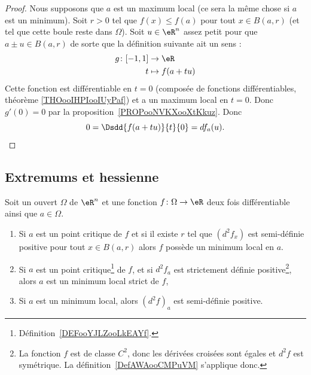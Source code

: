 \begin{proof}
	Nous supposons que \( a\) est un maximum local (ce sera la même chose si \( a\) est un minimum). Soit \( r>0\) tel que \( f(x)\leq f(a)\) pour tout \( x\in B(a,r)\) (et tel que cette boule reste dans \( \Omega\)). Soit \( u\in \eR^n\) assez petit pour que \( a\pm u\in B(a,r)\) de sorte que la définition suivante ait un sens :
	\begin{equation}
		\begin{aligned}
			g\colon \mathopen[ -1 , 1 \mathclose] & \to \eR         \\
			t                                     & \mapsto f(a+tu)
		\end{aligned}
	\end{equation}
	Cette fonction est différentiable en \( t=0\) (composée de fonctions différentiables, théorème \ref{THOooIHPIooIUyPaf}) et a un maximum local en \( t=0\). Donc \( g'(0)=0\) par la proposition~\ref{PROPooNVKXooXtKkuz}. Donc
	\begin{equation}
		0=\Dsdd{ f(a+tu) }{t}{0}=df_a(u).
	\end{equation}
\end{proof}

\subsection{Extremums et hessienne}

\begin{proposition}        \label{PropoExtreRn}
	Soit un ouvert \( \Omega\) de \( \eR^n\) et une fonction \( f\colon \Omega\to \eR\) deux fois différentiable ainsi que \( a\in\Omega\).
	\begin{enumerate}
		\item   \label{ITEMooCBMYooQQMqQL}
		      Si \( a\) est un point critique de \( f\) et si il existe \( r\) tel que \( (d^2f_x)\) est semi-définie positive pour tout \( x\in B(a,r)\) alors \( f\) possède un minimum local en \( a\).
		\item   \label{ITEMooCVFVooWltGqI}
		      Si \( a\) est un point critique\footnote{Définition~\ref{DEFooYJLZooLkEAYf}.} de \( f\), et si \( d^2f_a\) est strictement définie positive\footnote{La fonction \( f\) est de classe \( C^2\), donc les dérivées croisées sont égales et \( d^2f\) est symétrique. La définition~\ref{DefAWAooCMPuVM} s'applique donc.}, alors \( a\) est un minimum local strict de \( f\),
		\item\label{ItemPropoExtreRn}
		      Si \( a\) est un minimum local, alors \( (d^2f)_a\) est semi-définie positive.
	\end{enumerate}
\end{proposition}


